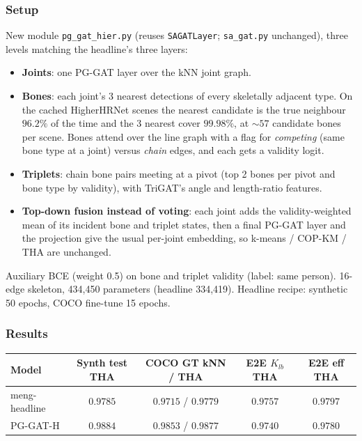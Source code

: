 \subsubsection{Setup}

New module \texttt{pg\_gat\_hier.py} (reuses \texttt{SAGATLayer}; \texttt{sa\_gat.py} unchanged), three levels matching the headline's three layers:
\begin{itemize}
    \item \textbf{Joints}: one PG-GAT layer over the kNN joint graph.
    \item \textbf{Bones}: each joint's 3 nearest detections of every skeletally adjacent type. On the cached HigherHRNet scenes the nearest candidate is the true neighbour $96.2\%$ of the time and the 3 nearest cover $99.98\%$, at $\sim\!57$ candidate bones per scene. Bones attend over the line graph with a flag for \emph{competing} (same bone type at a joint) versus \emph{chain} edges, and each gets a validity logit.
    \item \textbf{Triplets}: chain bone pairs meeting at a pivot (top 2 bones per pivot and bone type by validity), with TriGAT's angle and length-ratio features.
    \item \textbf{Top-down fusion instead of voting}: each joint adds the validity-weighted mean of its incident bone and triplet states, then a final PG-GAT layer and the projection give the usual per-joint embedding, so k-means / COP-KM / THA are unchanged.
\end{itemize}
Auxiliary BCE (weight 0.5) on bone and triplet validity (label: same person). 16-edge skeleton, 434,450 parameters (headline 334,419). Headline recipe: synthetic 50 epochs, COCO fine-tune 15 epochs.

\subsubsection{Results}

\begin{tabular}{lcccc}
\hline
\textbf{Model} & \textbf{Synth test THA} & \textbf{COCO GT kNN / THA} & \textbf{E2E $K_{lb}$ THA} & \textbf{E2E eff THA} \\
\hline
meng-headline         & $0.9785$ & $0.9715$ / $0.9779$ & $\mathbf{0.9757}$ & $\mathbf{0.9797}$ \\
PG-GAT-H              & $\mathbf{0.9884}$ & $\mathbf{0.9853}$ / $\mathbf{0.9877}$ & $0.9740$ & $0.9780$ \\
\hline
\end{tabular}

